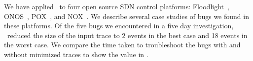 We have applied \simulator~to four open source SDN control
platforms: Floodlight~\cite{bigswitch}, ONOS~\cite{ONOS}, POX~\cite{pox}, and NOX~\cite{nox}.
We describe several case studies of bugs we found in these platforms. Of the \num{five} bugs we encountered in a five day investigation, \simulator~reduced the size of the input trace to 2 events in the best case
and 18 events in the worst case. We compare the time taken to troubleshoot
the bugs with and without minimized traces to show the value in \simulator.



